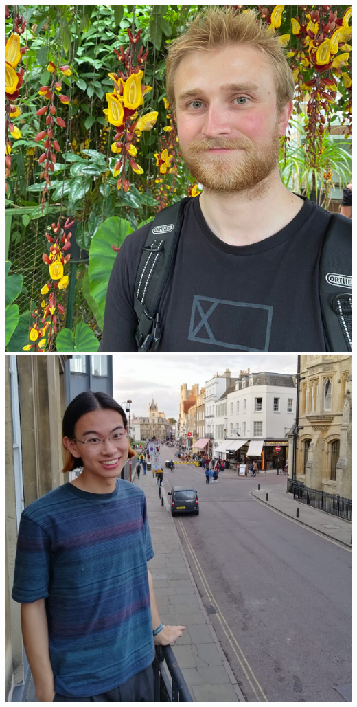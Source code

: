\documentclass[aspectratio=169]{beamer}
\begin{document}
\begin{frame}
{            \includegraphics[width=0.1\textheight]{figures/students/will_barker.jpg}%
            \includegraphics[width=0.1\textheight]{figures/students/zixiao_hu.jpg}%
}
\end{frame}
\end{document}
